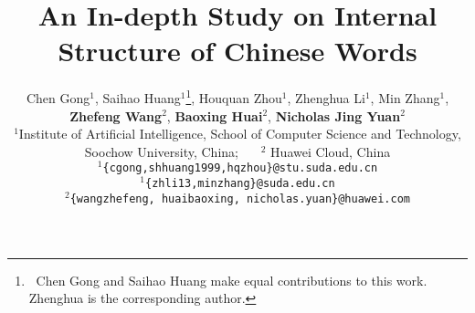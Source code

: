 \documentclass[11pt,a4paper]{article}
\title{
An In-depth Study on Internal Structure of Chinese Words
}
\author{
Chen Gong$^{1}$, Saihao Huang$^1$\thanks{$~$ Chen Gong and Saihao Huang make equal contributions to this
work. Zhenghua is the corresponding author.}, Houquan Zhou$^1$, Zhenghua Li$^1$, Min Zhang$^1$,\\ {\bf Zhefeng Wang}$^2$, {\bf Baoxing Huai}$^2$, {\bf Nicholas Jing Yuan}$^2$ \\
$^1$Institute of Artificial Intelligence, School of Computer Science and Technology, \\Soochow University, China; $~~~~~$
$^2$ Huawei Cloud, China  \\
{\tt $^1$\{cgong,shhuang1999,hqzhou\}@stu.suda.edu.cn} \\
{\tt $^1$\{zhli13,minzhang\}@suda.edu.cn} \\
{\tt $^2$\{wangzhefeng, huaibaoxing, nicholas.yuan\}@huawei.com} \\
}
\date{}
\begin{document}
\maketitle
\begin{CJK}{UTF8}{gkai}






%



% 







\end{CJK}
\end{document}
